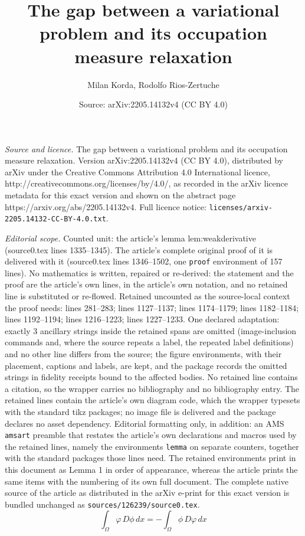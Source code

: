 \documentclass[10pt,a4paper]{amsart}
\title{The gap between a variational problem and its occupation measure relaxation}
\author{Milan Korda, Rodolfo Rios-Zertuche}
\date{Source: arXiv:2205.14132v4 (CC BY 4.0)}
\begin{document}
\maketitle

\noindent\emph{Source and licence.} The gap between a variational problem and its occupation measure relaxation. Version arXiv:2205.14132v4 (CC BY 4.0), distributed by arXiv under the Creative Commons Attribution 4.0 International licence, http://creativecommons.org/licenses/by/4.0/, as recorded in the arXiv licence metadata for this exact version and shown on the abstract page https://arxiv.org/abs/2205.14132v4. Full licence notice: \texttt{licenses/arxiv-2205.14132-CC-BY-4.0.txt}.\par\smallskip

\noindent\textit{Editorial scope.} Counted unit: the article's lemma lem:weakderivative (source0.tex lines 1335--1345). The article's complete original proof of it is delivered with it (source0.tex lines 1346--1502, one \texttt{proof} environment of 157 lines). No mathematics is written, repaired or re-derived: the statement and the proof are the article's own lines, in the article's own notation, and no retained line is substituted or re-flowed.  Retained uncounted as the source-local context the proof needs: lines 281--283; lines 1127--1137; lines 1174--1179; lines 1182--1184; lines 1192--1194; lines 1216--1223; lines 1227--1233.  One declared adaptation: exactly 3 ancillary strings inside the retained spans are omitted (image-inclusion commands and, where the source repeats a label, the repeated label definitions) and no other line differs from the source; the figure environments, with their placement, captions and labels, are kept, and the package records the omitted strings in fidelity receipts bound to the affected bodies.  No retained line contains a citation, so the wrapper carries no bibliography and no bibliography entry.  The retained lines contain the article's own diagram code, which the wrapper typesets with the standard tikz packages; no image file is delivered and the package declares no asset dependency.  Editorial formatting only, in addition: an AMS \texttt{amsart} preamble that restates the article's own declarations and macros used by the retained lines, namely the environments \texttt{lemma} on separate counters, together with the standard packages those lines need.  The retained environments print in this document as Lemma 1 in order of appearance, whereas the article prints the same items with the numbering of its own full document.  The complete native source of the article as distributed in the arXiv e-print for this exact version is bundled unchanged as \texttt{sources/126239/source0.tex}.
\begin{equation}\label{eq:defweakdiff}
 \int_\Omega \varphi \,D\phi\,dx=-\int_\Omega \phi \, D\varphi\,dx
\end{equation}
\end{document}
